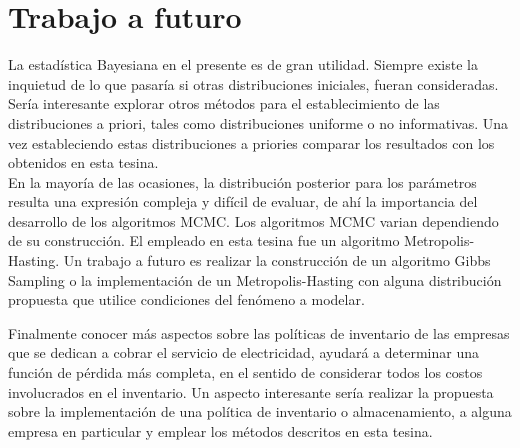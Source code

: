 \section{Trabajo a futuro}

\noindent La estad\'istica Bayesiana en el presente es de gran utilidad. Siempre existe la inquietud de lo que pasar\'ia si otras distribuciones iniciales, fueran consideradas. Ser\'ia interesante explorar otros m\'etodos para el establecimiento de las distribuciones a priori, tales como distribuciones uniforme o no informativas. Una vez estableciendo estas distribuciones a priories comparar los resultados con los obtenidos en esta tesina.\\


\noindent En la mayor\'ia de las ocasiones, la distribuci\'on posterior para los par\'ametros resulta una  expresi\'on compleja y dif\'icil de evaluar, de ah\'i la importancia del desarrollo de los algoritmos MCMC. Los algoritmos MCMC varian dependiendo de su construcci\'on. El empleado en esta tesina fue un algoritmo Metropolis-Hasting. Un trabajo a futuro es realizar la construcci\'on de un algoritmo Gibbs Sampling o la implementaci\'on de un Metropolis-Hasting con alguna distribuci\'on propuesta que utilice condiciones del fen\'omeno a modelar.

\noindent Finalmente conocer m\'as aspectos sobre las pol\'iticas de inventario de las empresas que se dedican a cobrar el servicio de electricidad, ayudar\'a a determinar una funci\'on de p\'erdida m\'as completa, en el sentido de considerar todos los costos involucrados en el inventario. Un aspecto interesante ser\'ia realizar la propuesta sobre la implementaci\'on de una pol\'itica de inventario o almacenamiento, a alguna empresa en particular y emplear los m\'etodos descritos en esta tesina.
%
%
%


